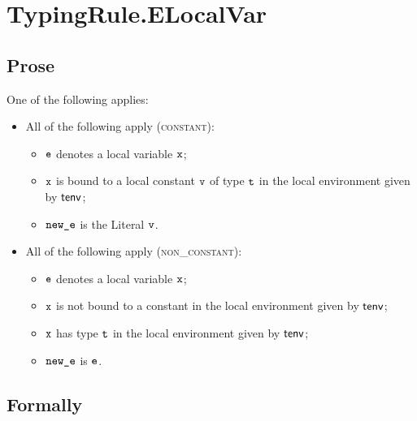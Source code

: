 \section{TypingRule.ELocalVar \label{sec:TypingRule.ELocalVar}}
\subsection{Prose}
One of the following applies:
\begin{itemize}
  \item All of the following apply (\textsc{constant}):
  \begin{itemize}
  \item $\ve$ denotes a local variable $\vx$;
  \item $\vx$ is bound to a local constant $\vv$ of type $\vt$ in the local environment given by $\tenv$;
  \item $\newe$ is the Literal $\vv$.
  \end{itemize}

  \item All of the following apply (\textsc{non\_constant}):
  \begin{itemize}
  \item $\ve$ denotes a local variable $\vx$;
  \item $\vx$ is not bound to a constant in the local environment given by $\tenv$;
  \item $\vx$ has type $\vt$ in the local environment given by $\tenv$;
  \item $\newe$ is $\ve$.
  \end{itemize}
\end{itemize}

\subsection{Formally}
\begin{mathpar}
\end{mathpar}

\begin{mathpar}
\end{mathpar}

